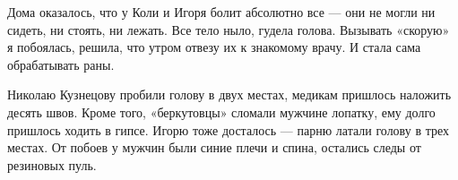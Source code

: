Дома оказалось, что у Коли и Игоря болит абсолютно все — они не могли ни
сидеть, ни стоять, ни лежать. Все тело ныло, гудела голова. Вызывать «скорую» я
побоялась, решила, что утром отвезу их к знакомому врачу. И стала сама
обрабатывать раны.

Николаю Кузнецову пробили голову в двух местах, медикам пришлось наложить
десять швов. Кроме того, «беркутовцы» сломали мужчине лопатку, ему долго
пришлось ходить в гипсе. Игорю тоже досталось — парню латали голову в трех
местах. От побоев у мужчин были синие плечи и спина, остались следы от
резиновых пуль.
